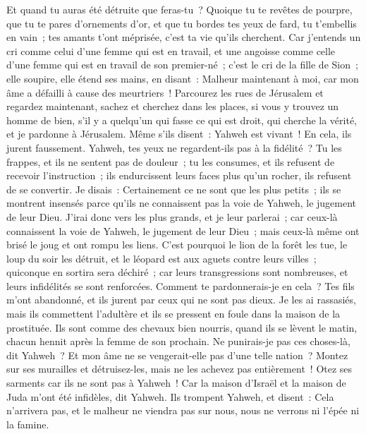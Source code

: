 \begin{multicols}{2}
Et quand tu auras été détruite que feras-tu~? Quoique tu te revêtes de pourpre, que tu te pares d'ornements d'or, et que tu bordes tes yeux de fard, tu t'embellis en vain~; tes amants t'ont méprisée, c'est ta vie qu'ils cherchent.
Car j'entends un cri comme celui d'une femme qui est en travail, et une angoisse comme celle d'une femme qui est en travail de son premier-né~; c'est le cri de la fille de Sion~; elle soupire, elle étend ses mains, en disant~: Malheur maintenant à moi, car mon âme a défailli à cause des meurtriers~! 
\VerseOne{}Parcourez les rues de Jérusalem et regardez maintenant, sachez et cherchez dans les places, si vous y trouvez un homme de bien, s'il y a quelqu'un qui fasse ce qui est droit, qui cherche la vérité, et je pardonne à Jérusalem.
Même s'ils disent~: Yahweh est vivant~! En cela, ils jurent faussement.
Yahweh, tes yeux ne regardent-ils pas à la fidélité~? Tu les frappes, et ils ne sentent pas de douleur~; tu les consumes, et ils refusent de recevoir l'instruction~; ils endurcissent leurs faces plus qu'un rocher, ils refusent de se convertir.
Je disais~: Certainement ce ne sont que les plus petits~; ils se montrent insensés parce qu'ils ne connaissent pas la voie de Yahweh, le jugement de leur Dieu.
J'irai donc vers les plus grands, et je leur parlerai~; car ceux-là connaissent la voie de Yahweh, le jugement de leur Dieu~; mais ceux-là même ont brisé le joug et ont rompu les liens.
C'est pourquoi le lion de la forêt les tue, le loup du soir les détruit, et le léopard est aux aguets contre leurs villes~; quiconque en sortira sera déchiré~; car leurs transgressions sont nombreuses, et leurs infidélités se sont renforcées.
Comment te pardonnerais-je en cela~? Tes fils m'ont abandonné, et ils jurent par ceux qui ne sont pas dieux. Je les ai rassasiés, mais ils commettent l'adultère et ils se pressent en foule dans la maison de la prostituée.
Ils sont comme des chevaux bien nourris, quand ils se lèvent le matin, chacun hennit après la femme de son prochain.
Ne punirais-je pas ces choses-là, dit Yahweh~? Et mon âme ne se vengerait-elle pas d'une telle nation~?
Montez sur ses murailles et détruisez-les, mais ne les achevez pas entièrement~! Otez ses sarments car ils ne sont pas à Yahweh~!
Car la maison d'Israël et la maison de Juda m'ont été infidèles, dit Yahweh.
Ils trompent Yahweh, et disent~: Cela n'arrivera pas, et le malheur ne viendra pas sur nous, nous ne verrons ni l'épée ni la famine.

\end{multicols}
